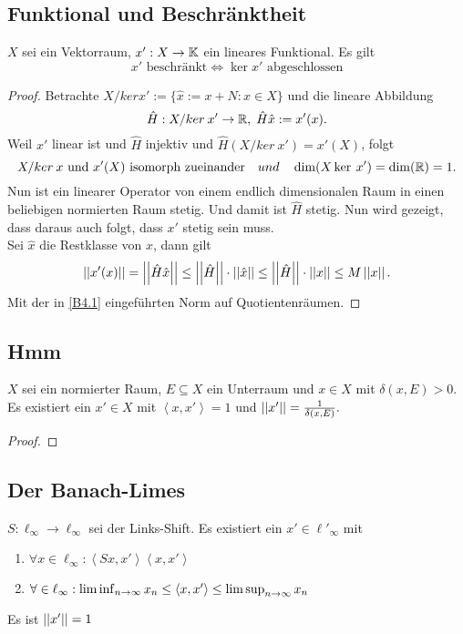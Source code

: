 \documentclass[FunkAnaSkript.tex]{subfiles}
\begin{document}
\subsection{ Funktional und Beschränktheit}
\label{B8.1}
	$X$ sei ein Vektorraum, $x' : X\to \mathbb{K}$ ein lineares Funktional. Es gilt
	$$x' \text{ beschränkt} \Leftrightarrow \ker x' \text{ abgeschlossen}$$

	\begin{proof}
		Betrachte $ X/ker x':= \{ \hat{x} := x + N: x\in X\} $ und die lineare Abbildung
			$$ \hat{H} : X/ker \:x' \to \mathbb{R}, \; \hat{H}\hat{x} := x'(x).$$
		Weil $x'$ linear ist und $\hat{H}$ injektiv und $\hat{H}(X/ker\: x') = x'(X)$, folgt
			$$X/ker\:x \text{ und } x'(X) \text{ isomorph zueinander} \quad und \quad \dim(X\ker \:x') = \dim(\mathbb{R}) = 1.$$ 
	Nun ist ein linearer Operator von einem endlich dimensionalen Raum in einen beliebigen normierten Raum stetig. Und damit ist $\hat{H}$ stetig. Nun wird gezeigt, dass daraus auch folgt, dass $x'$ stetig sein muss.\\
	Sei $\hat{x}$ die Restklasse von $x$, dann gilt 
		$$\left\lvert \left\lvert x'(x) \right\rvert \right\rvert = \left\lvert \left\lvert \hat{H}\hat{x} \right\rvert \right\rvert \leq \left\lvert \left\lvert \hat{H} \right\rvert \right\rvert \cdot \left\lvert \left\lvert \hat{x} \right\rvert \right\rvert \leq \left\lvert \left\lvert \hat{H} \right\rvert \right\rvert \cdot \left\lvert \left\lvert {x} \right\rvert \right\rvert \leq M \left\lvert \left\lvert x \right\rvert \right\rvert. $$ 
	Mit der in \ref{B4.1} eingeführten Norm auf Quotientenräumen.	
	\end{proof}
	


\subsection{ Hmm}
\label{B8.2}
	$X$ sei ein normierter Raum, $E\subseteq X$ ein Unterraum und $x\in X$ mit $\delta(x,E) > 0$. \\
	Es existiert ein $x'\in X$ mit $\left \langle x,x' \right \rangle = 1$ und $\left\lvert \left\lvert  x'  \right\rvert \right\rvert = \frac{1}{\delta(x,E)}.$
	
	\begin{proof}
	
	\end{proof}

\subsection{ Der Banach-Limes}
\label{B8.3}
	$S: \ell_\infty \to \ell_\infty$ sei der Links-Shift. Es existiert ein $x' \in \ell'_\infty$ mit
	\begin{enumerate}
		\item $\forall x \in \ell_\infty : \left \langle Sx, x' \right  \rangle \left \langle x,x' \right \rangle$
		\item $\forall \in \ell_\infty : \liminf_{n \to \infty} x_n \leq \left \langle x,x' \right \rangle \leq \limsup_{n\to\infty} x_n$
	\end{enumerate}
	Es ist $\left\lvert \left\lvert x' \right\rvert \right\rvert = 1$
	
\end{document}
